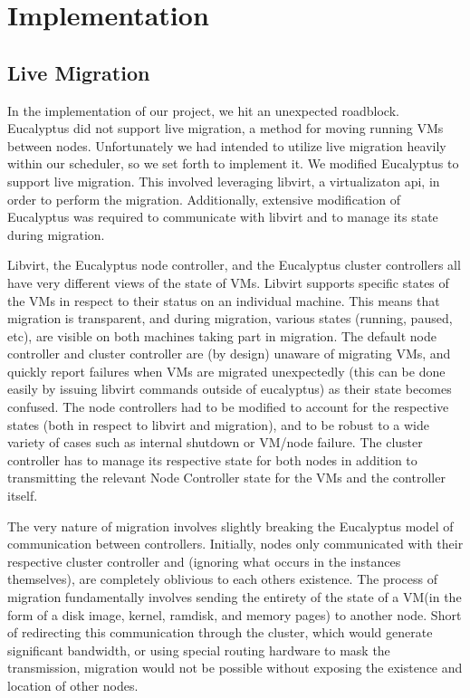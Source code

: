 \section{Implementation}

\subsection{Live Migration}

In the implementation of our project, we hit an unexpected roadblock.  Eucalyptus did not support live migration, a method for moving running VMs between nodes.  Unfortunately we had intended to utilize live migration heavily within our scheduler, so we set forth to implement it.  We modified Eucalyptus to support live migration.  This involved leveraging libvirt, a virtualizaton api, in order to perform the migration.  Additionally, extensive modification of Eucalyptus was required to communicate with libvirt and to manage its state during migration.  

Libvirt, the Eucalyptus node controller, and the Eucalyptus cluster controllers all have very different views of the state of VMs.  Libvirt supports specific states of the VMs in respect to their status on an individual machine. This means that migration is transparent, and during migration, various states (running, paused, etc), are visible on both machines taking part in migration.  The default node controller and cluster controller are (by design) unaware of migrating VMs, and quickly report failures when VMs are migrated unexpectedly (this can be done easily by issuing libvirt commands outside of eucalyptus) as their state becomes confused.  The node controllers had to be modified to account for the respective states (both in respect to libvirt and migration), and to be robust to a wide variety of cases such as internal shutdown or VM/node failure.  The cluster controller has to manage its respective state for both nodes in addition to transmitting the relevant Node Controller state for the VMs and the controller itself.  

The very nature of migration involves slightly breaking the Eucalyptus model of communication between controllers.  Initially, nodes only communicated with their respective cluster controller and (ignoring what occurs in the instances themselves), are completely oblivious to each others existence.  The process of migration fundamentally involves sending the entirety of the state of a VM(in the form of a disk image, kernel, ramdisk, and memory pages) to another node.  Short of redirecting this communication through the cluster, which would generate significant bandwidth, or using special routing hardware to mask the transmission, migration would not be possible without exposing the existence and location of other nodes.  



